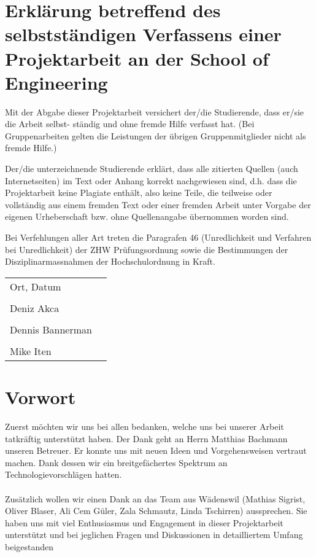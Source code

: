 \documentclass[../main.tex]{subfiles}
\begin{document}
	
	\section*{Erklärung betreffend des selbstständigen Verfassens einer Projektarbeit an der School of Engineering}
	
	Mit der Abgabe dieser Projektarbeit versichert der/die Studierende, dass er/sie die Arbeit selbst-
	ständig und ohne fremde Hilfe verfasst hat. (Bei Gruppenarbeiten gelten die Leistungen der übrigen
	Gruppenmitglieder nicht als fremde Hilfe.)\vspace{5mm}
	
	Der/die unterzeichnende Studierende erklärt, dass alle zitierten Quellen (auch Internetseiten) im Text
	oder Anhang korrekt nachgewiesen sind, d.h. dass die Projektarbeit keine Plagiate enthält, also keine
	Teile, die teilweise oder vollständig aus einem fremden Text oder einer fremden Arbeit unter Vorgabe der
	eigenen Urheberschaft bzw. ohne Quellenangabe übernommen worden sind.\vspace{5mm}
	
	Bei Verfehlungen aller Art treten die Paragrafen 46 (Unredlichkeit und Verfahren bei Unredlichkeit) der
	ZHW Prüfungsordnung sowie die Bestimmungen der Disziplinarmassnahmen der Hochschulordnung in
	Kraft.\vspace{15mm}
	
	\noindent\begin{tabular}{@{}p{2.5in}p{2.5in}@{}}
		Ort, Datum                       & \dotfill\\
		\\
		Deniz Akca                       & \dotfill\\
		\\
		Dennis Bannerman                 & \dotfill\\
		\\
		Mike Iten                        & \dotfill\\
	\end{tabular} 
	
	\newpage
	
	\section{Vorwort}
	Zuerst möchten wir uns bei allen bedanken, welche uns bei unserer Arbeit tatkräftig unterstützt haben. Der Dank geht an Herrn Matthias Bachmann unseren Betreuer. Er konnte uns mit neuen Ideen und Vorgehensweisen vertraut machen. Dank dessen wir ein breitgefächertes Spektrum an Technologievorschlägen hatten. \\
	\\
	Zusätzlich wollen wir einen Dank an das Team aus Wädenswil (Mathias Sigrist, Oliver Blaser, Ali Cem Güler, Zala Schmautz, Linda Tschirren) aussprechen. Sie haben uns mit viel Enthusiasmus und Engagement in dieser Projektarbeit unterstützt und bei jeglichen Fragen und Diskussionen in detailliertem Umfang beigestanden
	
\end{document}
